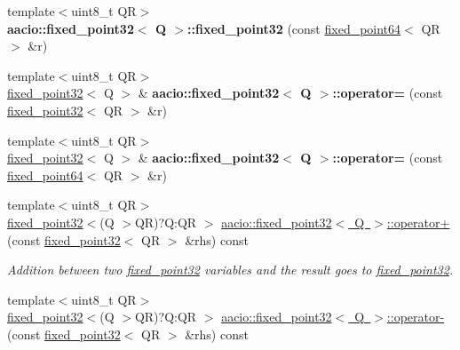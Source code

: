 \begin{DoxyCompactItemize}
\item 
\mbox{\label{group__fixedpoint_ga6aa0fe51fb5f7a46de7b7c0e004c2709}} 
{\footnotesize template$<$uint8\+\_\+t QR$>$ }\\{\bfseries aacio\+::fixed\+\_\+point32$<$ Q $>$\+::fixed\+\_\+point32} (const \mbox{\hyperlink{structaacio_1_1fixed__point64}{fixed\+\_\+point64}}$<$ QR $>$ \&r)
\item 
\mbox{\label{group__fixedpoint_ga61e808e94550580c1f72bd18f53e9602}} 
{\footnotesize template$<$uint8\+\_\+t QR$>$ }\\\mbox{\hyperlink{structaacio_1_1fixed__point32}{fixed\+\_\+point32}}$<$ Q $>$ \& {\bfseries aacio\+::fixed\+\_\+point32$<$ Q $>$\+::operator=} (const \mbox{\hyperlink{structaacio_1_1fixed__point32}{fixed\+\_\+point32}}$<$ QR $>$ \&r)
\item 
\mbox{\label{group__fixedpoint_ga79c02134b038d1cd942a42250114946f}} 
{\footnotesize template$<$uint8\+\_\+t QR$>$ }\\\mbox{\hyperlink{structaacio_1_1fixed__point32}{fixed\+\_\+point32}}$<$ Q $>$ \& {\bfseries aacio\+::fixed\+\_\+point32$<$ Q $>$\+::operator=} (const \mbox{\hyperlink{structaacio_1_1fixed__point64}{fixed\+\_\+point64}}$<$ QR $>$ \&r)
\item 
{\footnotesize template$<$uint8\+\_\+t QR$>$ }\\\mbox{\hyperlink{structaacio_1_1fixed__point32}{fixed\+\_\+point32}}$<$(Q $>$QR)?Q\+:\+QR $>$ \mbox{\hyperlink{group__fixedpoint_gae544257783a230bb6b33942a19925f6f}{aacio\+::fixed\+\_\+point32$<$ Q $>$\+::operator+}} (const \mbox{\hyperlink{structaacio_1_1fixed__point32}{fixed\+\_\+point32}}$<$ QR $>$ \&rhs) const
\begin{DoxyCompactList}\small\item\em Addition between two \mbox{\hyperlink{structaacio_1_1fixed__point32}{fixed\+\_\+point32}} variables and the result goes to \mbox{\hyperlink{structaacio_1_1fixed__point32}{fixed\+\_\+point32}}. \end{DoxyCompactList}\item 
{\footnotesize template$<$uint8\+\_\+t QR$>$ }\\\mbox{\hyperlink{structaacio_1_1fixed__point32}{fixed\+\_\+point32}}$<$(Q $>$QR)?Q\+:\+QR $>$ \mbox{\hyperlink{group__fixedpoint_ga3dba31f55ab94161ac1db5c7dda2e1ee}{aacio\+::fixed\+\_\+point32$<$ Q $>$\+::operator-\/}} (const \mbox{\hyperlink{structaacio_1_1fixed__point32}{fixed\+\_\+point32}}$<$ QR $>$ \&rhs) const

\end{DoxyCompactItemize}
